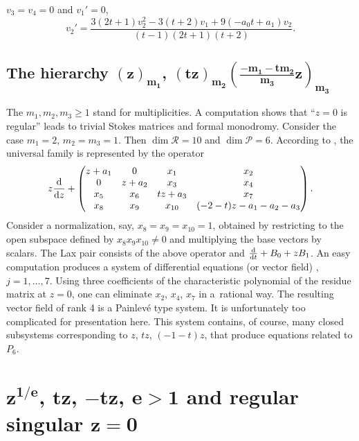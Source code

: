 \documentclass[pdftex]{sigma}
\numberwithin{equation}{section}
\begin{document}
\begin{Example}
 $v_3=v_4=0$ and $v_1'=0$, \[
 v_2'=\frac{3(2t+1)v_2^2-3(t+2)v_1+9(-a_0t+a_1)v_2}{(t-1)(2t+1)(t+2)}.
 \]
\end{Example}

\subsection[The hierarchy z-sub(m1), (tz)-sub(m2), ((-m1-tm2)z/m3(-sub(m3)]{The hierarchy $\boldsymbol{(z)_{m_1}}$, $\boldsymbol{(tz)_{m_2} (\frac{-m_1-tm_2}{m_3}z)_{m_3}}$}

The $m_1,m_2,m_3\geq 1$ stand for multiplicities. A computation shows that ``$z=0$ is regular'' leads to trivial Stokes matrices and
formal monodromy. Consider the case $m_1=2$, $m_2=m_3=1$. Then $\dim \mathcal{R} =10$ and $\dim \mathcal{P}=6$.
According to \cite[Exercise~12.5, p.~300]{vdP-Si}, the universal family is represented by the operator
\[z\frac{{\rm d}}{{\rm d}z} +
\begin{pmatrix} z+a_1 &0 & x_1&x_2 \\ 0 &z+a_2 & x_3&x_4 \\ x_5& x_6& tz+a_3&x_7 \\ x_8&x_9 &x_{10} & (-2-t)z-a_1-a_2-a_3\end{pmatrix} .\]
 Consider a normalization, say, $x_8=x_9=x_{10}=1$, obtained by restricting to the open subspace defined by $x_8x_9x_{10}\neq 0$
and multiplying the base vectors by scalars. The Lax pair consists of the above operator and $\frac{{\rm d}}{{\rm d}t}+B_0+zB_1$.
An easy computation produces a system of differential equations (or vector field)
 , $ j=1,\dots, 7$. Using three coefficients of the characteristic polynomial of the residue matrix at $z=0$, one can eliminate $x_2$, $x_4$, $x_7$ in a~rational way.
The resulting vector field of rank 4 is a Painlev\'e type system. It is unfortunately too complicated for presentation here.
This system contains, of course, many closed subsystems corresponding to $z$, $tz$, $(-1-t)z$, that produce
equations related to $P_6$.

\section[e-th root of z, tz, -tz for e at least 2 and regular singular z=0]{$\boldsymbol{z^{1/e}}$, $\boldsymbol{tz}$, $\boldsymbol{-tz}$, $\boldsymbol{e>1}$ and regular singular $\boldsymbol{z=0}$}\label{sec9}
\end{document}
